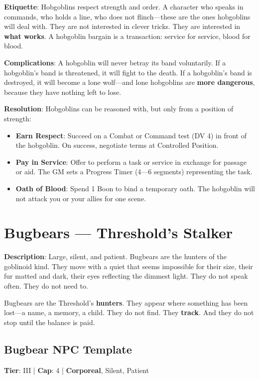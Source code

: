 \textbf{Etiquette}: Hobgoblins respect strength and order. A character who speaks in commands, who holds a line, who does not flinch---these are the ones hobgoblins will deal with. They are not interested in clever tricks. They are interested in \textbf{what works}. A hobgoblin bargain is a transaction: service for service, blood for blood.

\textbf{Complications}: A hobgoblin will never betray its band voluntarily. If a hobgoblin's band is threatened, it will fight to the death. If a hobgoblin's band is destroyed, it will become a lone wolf---and lone hobgoblins are \textbf{more dangerous}, because they have nothing left to lose.

\textbf{Resolution}: Hobgoblins can be reasoned with, but only from a position of strength:
\begin{itemize}
    \item \textbf{Earn Respect}: Succeed on a Combat or Command test (DV 4) in front of the hobgoblin. On success, negotiate terms at Controlled Position.
    \item \textbf{Pay in Service}: Offer to perform a task or service in exchange for passage or aid. The GM sets a Progress Timer (4---6 segments) representing the task.
    \item \textbf{Oath of Blood}: Spend 1 Boon to bind a temporary oath. The hobgoblin will not attack you or your allies for one scene.
\end{itemize}

\section{Bugbears --- Threshold's Stalker}

\textbf{Description}: Large, silent, and patient. Bugbears are the hunters of the goblinoid kind. They move with a quiet that seems impossible for their size, their fur matted and dark, their eyes reflecting the dimmest light. They do not speak often. They do not need to.

Bugbears are the Threshold's \textbf{hunters}. They appear where something has been lost---a name, a memory, a child. They do not find. They \textbf{track}. And they do not stop until the balance is paid.

\subsection{Bugbear NPC Template}

\textbf{Tier}: III | \textbf{Cap}: 4 | \textbf{Corporeal}, Silent, Patient

